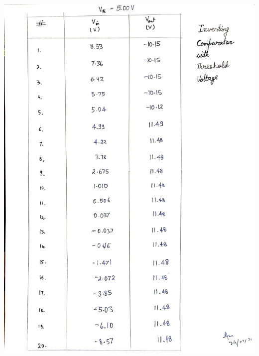 \begin{center}
    \includegraphics[scale = 0.28]{OPAMP Apps/invcompthres.jpg}
\end{center}
\clearpage
